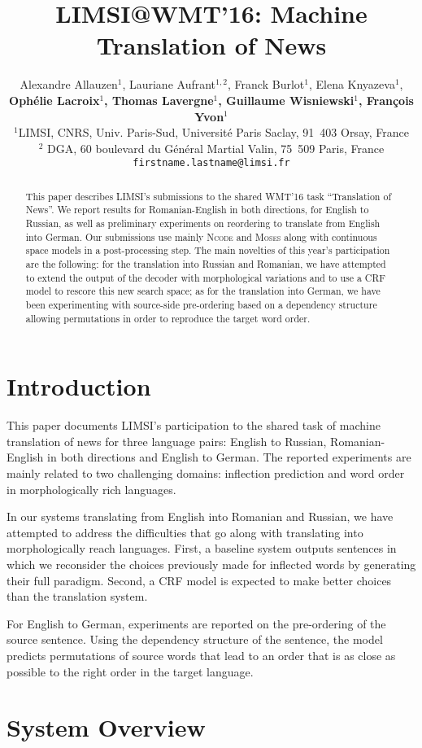 \documentclass[11pt]{article}
\title{LIMSI@WMT'16: Machine Translation of News}
\author{
Alexandre Allauzen$^{1}$,
Lauriane Aufrant$^{1,2}$,
Franck Burlot$^{1}$,
Elena Knyazeva$^{1}$,\\
\textbf{Oph\'{e}lie Lacroix$^{1}$,
Thomas Lavergne$^{1}$,
Guillaume Wisniewski$^{1}$,
Fran\c{c}ois Yvon$^{1}$}\\
$^1$LIMSI, CNRS, Univ. Paris-Sud, Universit\'{e} Paris Saclay, 91~403 Orsay, France\\
$^2$ DGA, 60 boulevard du G\'{e}n\'{e}ral Martial Valin, 75~509 Paris, France\\
 {\tt firstname.lastname@limsi.fr}}
\date{}
\newcommand{\ncode}{\textsc{Ncode}\xspace}
\newcommand{\moses}{\textsc{Moses}\xspace}
\begin{document}
\maketitle
\begin{abstract}
  This paper describes LIMSI's submissions to the shared WMT'16 task
  ``Translation of News''. We report results for Romanian-English in both
  directions, for English to Russian, as well as preliminary
  experiments on reordering to translate from English into German.
  Our submissions use mainly
  \ncode{} and \moses along with continuous space models in a
  post-processing step. The main novelties of this year's
  participation are the following:
  for the translation into Russian and Romanian, we have attempted
  to extend the output of the decoder with morphological variations
  and to use a CRF model to rescore this new search space; as for the
  translation into German, we have been experimenting with source-side
  pre-ordering based on a dependency structure allowing permutations
  in order to reproduce the target word order.
\end{abstract}


\section{Introduction}

This paper documents LIMSI's  participation to the shared task of machine
translation of news for three language pairs: English to Russian,
Romanian-English in both directions and English to German. The reported
experiments are mainly related to two challenging domains: inflection
prediction and word order in morphologically rich languages.

In our systems translating from English into Romanian and Russian, 
we have attempted to address the difficulties that go along with translating
into morphologically reach languages. First, a baseline system
outputs sentences in which we reconsider the choices previously made
for inflected words by generating their full paradigm.
Second, a CRF model is expected to make better choices than
the translation system.

For English to German, experiments are reported on the pre-ordering
of the source sentence. Using the dependency structure of the sentence,
the model predicts permutations of source words that lead to an order
that is as close as possible to the right order in the target language.


\section{System Overview}
\label{sec:sys}
\end{document}

